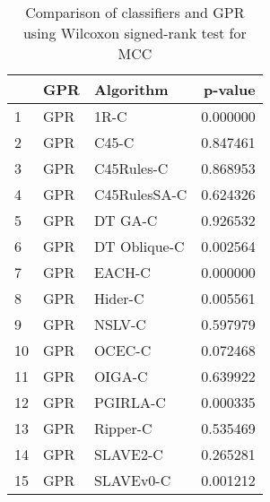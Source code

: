 \begin{table}
\footnotesize
\caption{Comparison of classifiers and GPR using Wilcoxon signed-rank test for MCC}
\label{tab:GPR wilcoxon MCC comparison}
\begin{tabular}{lllr}
\hline
 & GPR & Algorithm & p-value \\
\hline
1 & GPR & 1R-C & 0.000000 \\
2 & GPR & C45-C & 0.847461 \\
3 & GPR & C45Rules-C & 0.868953 \\
4 & GPR & C45RulesSA-C & 0.624326 \\
5 & GPR & DT GA-C & 0.926532 \\
6 & GPR & DT Oblique-C & 0.002564 \\
7 & GPR & EACH-C & 0.000000 \\
8 & GPR & Hider-C & 0.005561 \\
9 & GPR & NSLV-C & 0.597979 \\
10 & GPR & OCEC-C & 0.072468 \\
11 & GPR & OIGA-C & 0.639922 \\
12 & GPR & PGIRLA-C & 0.000335 \\
13 & GPR & Ripper-C & 0.535469 \\
14 & GPR & SLAVE2-C & 0.265281 \\
15 & GPR & SLAVEv0-C & 0.001212 \\
\hline
\end{tabular}
\end{table}
